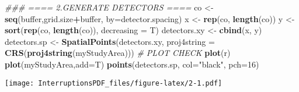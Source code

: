 \documentclass[
]{article}
\newenvironment{Shaded}{\begin{snugshade}}{\end{snugshade}}
\newcommand{\CommentTok}[1]{\textcolor[rgb]{0.56,0.35,0.01}{\textit{#1}}}
\newcommand{\DataTypeTok}[1]{\textcolor[rgb]{0.13,0.29,0.53}{#1}}
\newcommand{\DecValTok}[1]{\textcolor[rgb]{0.00,0.00,0.81}{#1}}
\newcommand{\KeywordTok}[1]{\textcolor[rgb]{0.13,0.29,0.53}{\textbf{#1}}}
\newcommand{\NormalTok}[1]{#1}
\newcommand{\OperatorTok}[1]{\textcolor[rgb]{0.81,0.36,0.00}{\textbf{#1}}}
\newcommand{\StringTok}[1]{\textcolor[rgb]{0.31,0.60,0.02}{#1}}
\begin{document}
\begin{Shaded}
\begin{Highlighting}[]
\CommentTok{### ==== 2.GENERATE DETECTORS  ====}
\NormalTok{co <-}\StringTok{ }\KeywordTok{seq}\NormalTok{(buffer,grid.size}\OperatorTok{+}\NormalTok{buffer, }\DataTypeTok{by=}\NormalTok{detector.spacing)}
\NormalTok{x <-}\StringTok{ }\KeywordTok{rep}\NormalTok{(co, }\KeywordTok{length}\NormalTok{(co))}
\NormalTok{y <-}\StringTok{ }\KeywordTok{sort}\NormalTok{(}\KeywordTok{rep}\NormalTok{(co, }\KeywordTok{length}\NormalTok{(co)), }\DataTypeTok{decreasing =}\NormalTok{ T)}
\NormalTok{detectors.xy <-}\StringTok{ }\KeywordTok{cbind}\NormalTok{(x, y)}
\NormalTok{detectors.sp <-}\StringTok{ }\KeywordTok{SpatialPoints}\NormalTok{(detectors.xy,}
                              \DataTypeTok{proj4string =} \KeywordTok{CRS}\NormalTok{(}\KeywordTok{proj4string}\NormalTok{(myStudyArea)))}
\CommentTok{# PLOT CHECK }
\KeywordTok{plot}\NormalTok{(r)}
\KeywordTok{plot}\NormalTok{(myStudyArea,}\DataTypeTok{add=}\NormalTok{T)}
\KeywordTok{points}\NormalTok{(detectors.sp, }\DataTypeTok{col=}\StringTok{"black"}\NormalTok{, }\DataTypeTok{pch=}\DecValTok{16}\NormalTok{)}
\end{Highlighting}
\end{Shaded}

\texttt{[image: InterruptionsPDF\_files/figure-latex/2-1.pdf]}
\end{document}
